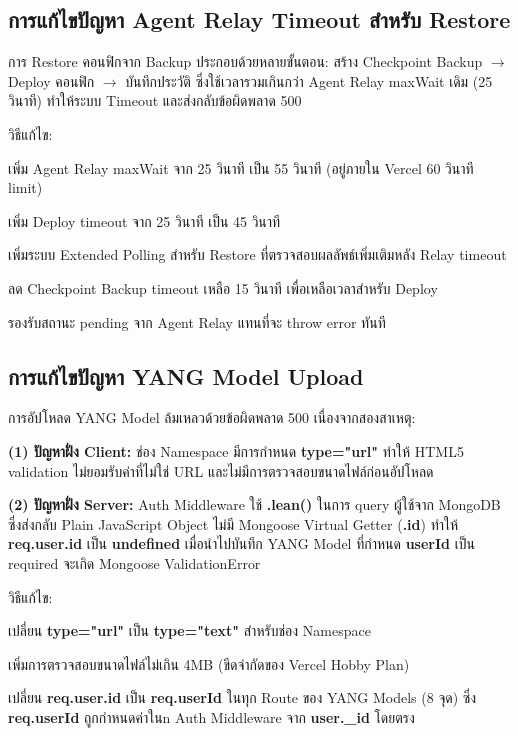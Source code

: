 \subsection{การแก้ไขปัญหา Agent Relay Timeout สำหรับ Restore}
\hspace*{1.3em}
การ Restore คอนฟิกจาก Backup ประกอบด้วยหลายขั้นตอน: สร้าง Checkpoint Backup $\rightarrow$ Deploy คอนฟิก $\rightarrow$ บันทึกประวัติ ซึ่งใช้เวลารวมเกินกว่า Agent Relay maxWait เดิม (25 วินาที) ทำให้ระบบ Timeout และส่งกลับข้อผิดพลาด 500

\hspace*{1.3em}
วิธีแก้ไข:
\begin{mycustomitem2}
    \item เพิ่ม Agent Relay maxWait จาก 25 วินาที เป็น 55 วินาที (อยู่ภายใน Vercel 60 วินาที limit)
    \item เพิ่ม Deploy timeout จาก 25 วินาที เป็น 45 วินาที
    \item เพิ่มระบบ Extended Polling สำหรับ Restore ที่ตรวจสอบผลลัพธ์เพิ่มเติมหลัง Relay timeout
    \item ลด Checkpoint Backup timeout เหลือ 15 วินาที เพื่อเหลือเวลาสำหรับ Deploy
    \item รองรับสถานะ pending จาก Agent Relay แทนที่จะ throw error ทันที
\end{mycustomitem2}

\subsection{การแก้ไขปัญหา YANG Model Upload}
\hspace*{1.3em}
การอัปโหลด YANG Model ล้มเหลวด้วยข้อผิดพลาด 500 เนื่องจากสองสาเหตุ:

\hspace*{1.3em}
\textbf{(1) ปัญหาฝั่ง Client:} ช่อง Namespace มีการกำหนด \textbf{type="url"} ทำให้ HTML5 validation ไม่ยอมรับค่าที่ไม่ใช่ URL และไม่มีการตรวจสอบขนาดไฟล์ก่อนอัปโหลด

\hspace*{1.3em}
\textbf{(2) ปัญหาฝั่ง Server:} Auth Middleware ใช้ \textbf{.lean()} ในการ query ผู้ใช้จาก MongoDB ซึ่งส่งกลับ Plain JavaScript Object ไม่มี Mongoose Virtual Getter (\textbf{.id}) ทำให้ \textbf{req.user.id} เป็น \textbf{undefined} เมื่อนำไปบันทึก YANG Model ที่กำหนด \textbf{userId} เป็น required จะเกิด Mongoose ValidationError

\hspace*{1.3em}
วิธีแก้ไข:
\begin{mycustomitem2}
    \item เปลี่ยน \textbf{type="url"} เป็น \textbf{type="text"} สำหรับช่อง Namespace
    \item เพิ่มการตรวจสอบขนาดไฟล์ไม่เกิน 4MB (ขีดจำกัดของ Vercel Hobby Plan)
    \item เปลี่ยน \textbf{req.user.id} เป็น \textbf{req.userId} ในทุก Route ของ YANG Models (8 จุด) ซึ่ง \textbf{req.userId} ถูกกำหนดค่าในn Auth Middleware จาก \textbf{user.\_id} โดยตรง
\end{mycustomitem2}

